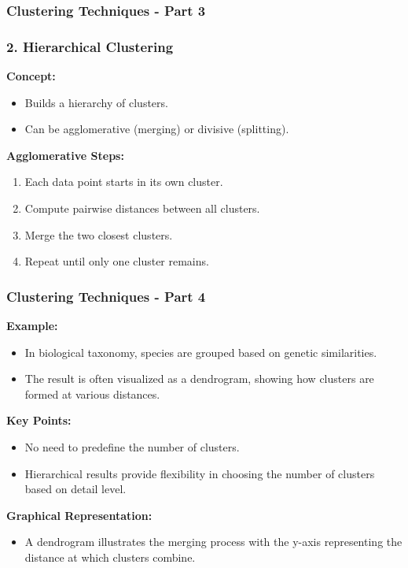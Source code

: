 \documentclass[aspectratio=169]{beamer}
\begin{document}
\begin{frame}[fragile]
    \frametitle{Clustering Techniques - Part 3}
    \frametitle{2. Hierarchical Clustering}
    
    \textbf{Concept:}
    \begin{itemize}
        \item Builds a hierarchy of clusters.
        \item Can be agglomerative (merging) or divisive (splitting).
    \end{itemize}
    
    \textbf{Agglomerative Steps:}
    \begin{enumerate}
        \item Each data point starts in its own cluster.
        \item Compute pairwise distances between all clusters.
        \item Merge the two closest clusters.
        \item Repeat until only one cluster remains.
    \end{enumerate}
\end{frame}

\begin{frame}[fragile]
    \frametitle{Clustering Techniques - Part 4}
    \textbf{Example:}
    \begin{itemize}
        \item In biological taxonomy, species are grouped based on genetic similarities.
        \item The result is often visualized as a dendrogram, showing how clusters are formed at various distances.
    \end{itemize}
    
    \textbf{Key Points:}
    \begin{itemize}
        \item No need to predefine the number of clusters.
        \item Hierarchical results provide flexibility in choosing the number of clusters based on detail level.
    \end{itemize}
    
    \textbf{Graphical Representation:}
    \begin{itemize}
        \item A dendrogram illustrates the merging process with the y-axis representing the distance at which clusters combine.
    \end{itemize}
\end{frame}
\end{document}
